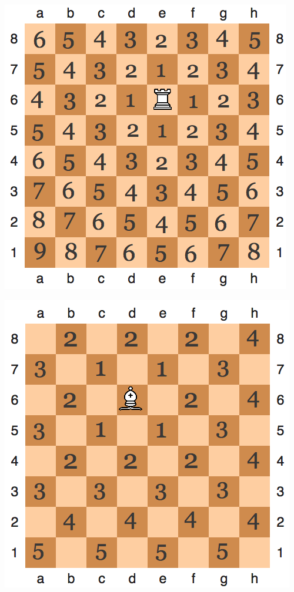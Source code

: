 \documentclass[12pt, a4paper, oneside]{article}
\begin{document}
{\begin{minipage}[t]{0.45\textwidth}
	\includegraphics[scale=0.5]{ladia.png}
\end{minipage}
\hfill
\begin{minipage}[t]{0.45\textwidth}
	\includegraphics[scale=0.5]{slon.png}
\end{minipage}

}
\end{document}
